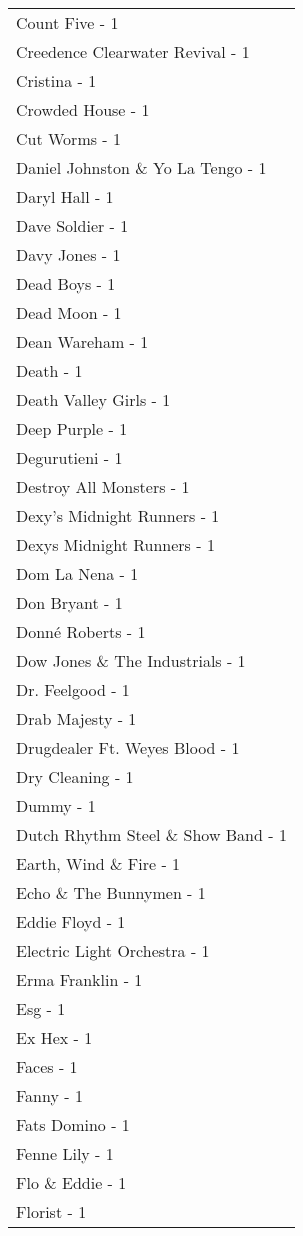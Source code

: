 \documentclass[
]{article}
\begin{document}
\begin{longtable}{l}
Count Five - 1 \\ 
Creedence Clearwater Revival - 1 \\ 
Cristina - 1 \\ 
Crowded House - 1 \\ 
Cut Worms - 1 \\ 
Daniel Johnston \& Yo La Tengo - 1 \\ 
Daryl Hall - 1 \\ 
Dave Soldier - 1 \\ 
Davy Jones - 1 \\ 
Dead Boys - 1 \\ 
Dead Moon - 1 \\ 
Dean Wareham - 1 \\ 
Death - 1 \\ 
Death Valley Girls - 1 \\ 
Deep Purple - 1 \\ 
Degurutieni - 1 \\ 
Destroy All Monsters - 1 \\ 
Dexy's Midnight Runners - 1 \\ 
Dexys Midnight Runners - 1 \\ 
Dom La Nena - 1 \\ 
Don Bryant - 1 \\ 
Donné Roberts - 1 \\ 
Dow Jones \& The Industrials - 1 \\ 
Dr. Feelgood - 1 \\ 
Drab Majesty - 1 \\ 
Drugdealer Ft. Weyes Blood - 1 \\ 
Dry Cleaning - 1 \\ 
Dummy - 1 \\ 
Dutch Rhythm Steel \& Show Band - 1 \\ 
Earth, Wind \& Fire - 1 \\ 
Echo \& The Bunnymen - 1 \\ 
Eddie Floyd - 1 \\ 
Electric Light Orchestra - 1 \\ 
Erma Franklin - 1 \\ 
Esg - 1 \\ 
Ex Hex - 1 \\ 
Faces - 1 \\ 
Fanny - 1 \\ 
Fats Domino - 1 \\ 
Fenne Lily - 1 \\ 
Flo \& Eddie - 1 \\ 
Florist - 1 \\ 

\end{longtable}
\end{document}
